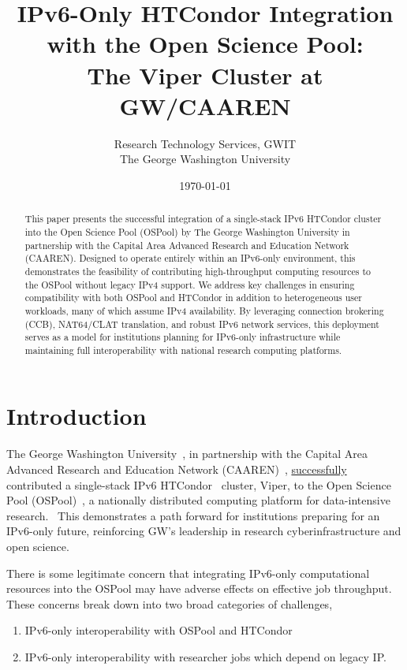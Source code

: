 \documentclass[11pt]{article}
\title{IPv6-Only HTCondor Integration with the Open Science Pool: \\
The Viper Cluster at GW/CAAREN}
\author{Research Technology Services, GWIT\\
The George Washington University}
\date{\today}
\begin{document}
\maketitle

\begin{abstract}
This paper presents the successful integration of a single-stack IPv6 HTCondor cluster into the Open Science Pool (OSPool) by The George Washington University in partnership with the Capital Area Advanced Research and Education Network (CAAREN). 
Designed to operate entirely within an IPv6-only environment, this demonstrates the feasibility of contributing 
high-throughput computing resources to the OSPool without legacy IPv4 support. We address key challenges in ensuring compatibility
with both OSPool and HTCondor in addition to heterogeneous user workloads, many of which assume IPv4 availability. By leveraging
connection brokering (CCB), NAT64/CLAT translation, and robust IPv6 network services, this deployment serves as a model for institutions
planning for IPv6-only infrastructure while maintaining full interoperability with national research computing platforms.
\end{abstract}
\tableofcontents

\section{Introduction}

The George Washington University~\cite{gwu}, in partnership with the Capital Area Advanced Research and Education Network (CAAREN)~\cite{caaren},  
\href{https://ce-dashboard.ospool.osg-htc.org/overview.html?host=gwu-viper-ce1&r=week}{successfully} 
contributed a single-stack IPv6 HTCondor~\cite{htcondor} cluster, Viper, to the Open Science Pool (OSPool)~\cite{ospool}, a nationally distributed computing platform for data-intensive research.~\cite{pordes2007,sfiligoi2009,osgospool,osgfs} This demonstrates a path forward for institutions preparing for an IPv6-only future, reinforcing GW’s leadership in research cyberinfrastructure and open science.

There is some legitimate concern that integrating IPv6-only computational resources into the OSPool may have adverse effects on effective job throughput. These concerns break down into two broad categories of challenges, 
\begin{enumerate}[itemsep=1pt]
\item IPv6-only interoperability with OSPool and HTCondor 
\item IPv6-only interoperability with researcher jobs which depend on legacy IP. 
\end{enumerate}
\end{document}
